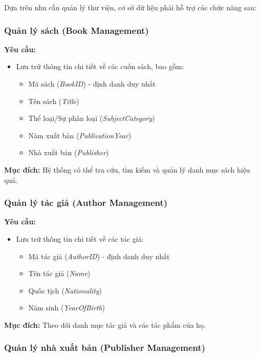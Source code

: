 \documentclass[12pt,a4paper]{article}
\newcommand{\attr}[1]{\textit{#1}}
\begin{document}
Dựa trên nhu cầu quản lý thư viện, cơ sở dữ liệu phải hỗ trợ các chức năng sau:

\subsubsection{Quản lý sách (Book Management)}

\textbf{Yêu cầu:}
\begin{itemize}
    \item Lưu trữ thông tin chi tiết về các cuốn sách, bao gồm:
    \begin{itemize}
        \item Mã sách (\attr{BookID}) - định danh duy nhất
        \item Tên sách (\attr{Title})
        \item Thể loại/Sự phân loại (\attr{SubjectCategory})
        \item Năm xuất bản (\attr{PublicationYear})
        \item Nhà xuất bản (\attr{Publisher})
    \end{itemize}
\end{itemize}

\textbf{Mục đích:} Hệ thống có thể tra cứu, tìm kiếm và quản lý danh mục sách hiệu quả.

\subsubsection{Quản lý tác giả (Author Management)}

\textbf{Yêu cầu:}
\begin{itemize}
    \item Lưu trữ thông tin chi tiết về các tác giả:
    \begin{itemize}
        \item Mã tác giả (\attr{AuthorID}) - định danh duy nhất
        \item Tên tác giả (\attr{Name})
        \item Quốc tịch (\attr{Nationality})
        \item Năm sinh (\attr{YearOfBirth})
    \end{itemize}
\end{itemize}

\textbf{Mục đích:} Theo dõi danh mục tác giả và các tác phẩm của họ.

\subsubsection{Quản lý nhà xuất bản (Publisher Management)}
\end{document}
